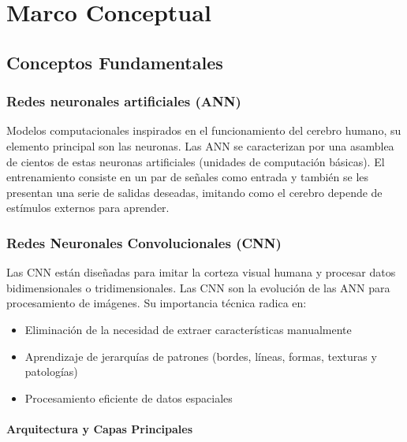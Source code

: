 \section{Marco Conceptual}

\subsection{Conceptos Fundamentales}

\subsubsection{Redes neuronales artificiales (ANN)}

 Modelos computacionales inspirados en el funcionamiento del cerebro humano, su elemento principal son las neuronas. Las ANN se caracterizan por una asamblea de cientos de estas neuronas artificiales (unidades de computación básicas). El entrenamiento consiste en un par de señales como entrada y también se les presentan una serie de salidas deseadas, imitando como el cerebro depende de estímulos externos para aprender.
 
\subsubsection{Redes Neuronales Convolucionales (CNN)}
 
Las CNN están diseñadas para imitar la corteza visual humana y procesar datos bidimensionales o tridimensionales. Las CNN son la evolución de las ANN para procesamiento de imágenes. Su importancia técnica radica en:

\begin{itemize}
    \item Eliminación de la necesidad de extraer características manualmente
    \item Aprendizaje de jerarquías de patrones (bordes, líneas, formas, texturas y patologías)
    \item Procesamiento eficiente de datos espaciales
\end{itemize} 

\paragraph{Arquitectura y Capas Principales}

